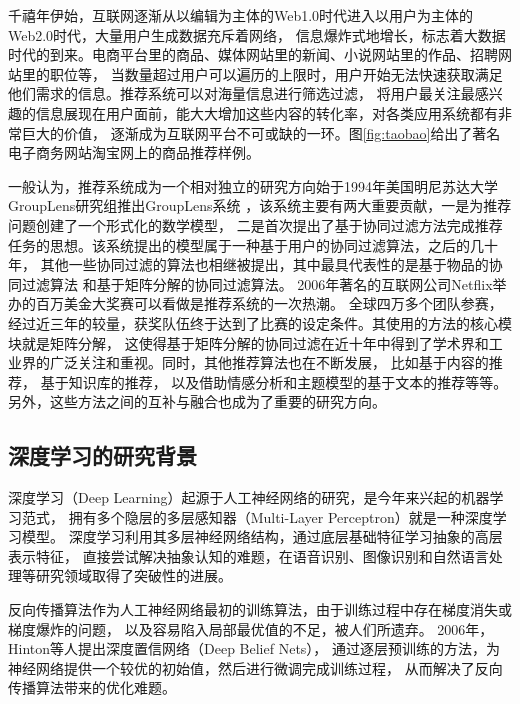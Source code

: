 千禧年伊始，互联网逐渐从以编辑为主体的Web1.0时代进入以用户为主体的Web2.0时代，大量用户生成数据充斥着网络，
信息爆炸式地增长，标志着大数据时代的到来。电商平台里的商品、媒体网站里的新闻、小说网站里的作品、招聘网站里的职位等，
当数量超过用户可以遍历的上限时，用户开始无法快速获取满足他们需求的信息。推荐系统可以对海量信息进行筛选过滤，
将用户最关注最感兴趣的信息展现在用户面前，能大大增加这些内容的转化率，对各类应用系统都有非常巨大的价值，
逐渐成为互联网平台不可或缺的一环。图\ref{fig:taobao}给出了著名电子商务网站淘宝网上的商品推荐样例。

一般认为，推荐系统成为一个相对独立的研究方向始于1994年美国明尼苏达大学GroupLens研究组推出GroupLens系统
\parencite{resnick1994grouplens}，该系统主要有两大重要贡献，一是为推荐问题创建了一个形式化的数学模型，
二是首次提出了基于协同过滤方法完成推荐任务的思想。该系统提出的模型属于一种基于用户的协同过滤算法，之后的几十年，
其他一些协同过滤的算法也相继被提出，其中最具代表性的是基于物品的协同过滤算法\parencite{sarwar2001item}
和基于矩阵分解的协同过滤算法\parencite{koren2009matrix}。
2006年著名的互联网公司Netflix举办的百万美金大奖赛\parencite{bennett2007netflix}可以看做是推荐系统的一次热潮。
全球四万多个团队参赛，经过近三年的较量，获奖队伍终于达到了比赛的设定条件。其使用的方法的核心模块就是矩阵分解，
这使得基于矩阵分解的协同过滤在近十年中得到了学术界和工业界的广泛关注和重视。同时，其他推荐算法也在不断发展，
比如基于内容的推荐\parencite{ricci2011introduction,pazzani2007content}，
基于知识库的推荐\parencite{trewin2000knowledge}，
以及借助情感分析\parencite{ganu2009beyond}和主题模型\parencite{wang2011collaborative}的基于文本的推荐等等。
另外，这些方法之间的互补与融合也成为了重要的研究方向\parencite{burke2002hybrid}。

\subsection{深度学习的研究背景}
深度学习（Deep Learning）起源于人工神经网络的研究，是今年来兴起的机器学习范式，
拥有多个隐层的多层感知器（Multi-Layer Perceptron）就是一种深度学习模型。
深度学习利用其多层神经网络结构，通过底层基础特征学习抽象的高层表示特征，
直接尝试解决抽象认知的难题，在语音识别、图像识别和自然语言处理等研究领域取得了突破性的进展。

反向传播算法作为人工神经网络最初的训练算法，由于训练过程中存在梯度消失或梯度爆炸的问题，
以及容易陷入局部最优值的不足，被人们所遗弃。
2006年，Hinton等人\parencite{hinton2006fast}提出深度置信网络（Deep Belief Nets），
通过逐层预训练的方法，为神经网络提供一个较优的初始值，然后进行微调完成训练过程，
从而解决了反向传播算法带来的优化难题。

